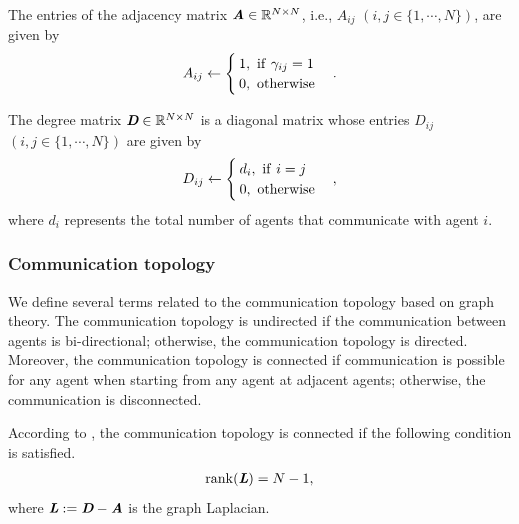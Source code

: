 \documentclass[letterpaper, 10 pt, conference]{ieeeconf} %
\begin{document}
The entries of the adjacency matrix $\textit{\textbf{A}}\in \mathbb{R}^{N\times N}$, i.e., $A_{ij}$ $(i,j\in\{1,\cdots,N\})$, are given by
\begin{eqnarray}
A_{ij}\leftarrow
\begin{cases}
1,\ {\rm if}\ \gamma_{ij}=1 \\
0,\ {\rm otherwise}
\end{cases}.
\nonumber
\end{eqnarray}

The degree matrix $\textit{\textbf{D}}\in \mathbb{R}^{N\times N}$ is a diagonal matrix whose entries $D_{ij}$ $(i,j\in\{1,\cdots,N\})$ are given by
\begin{eqnarray}
D_{ij}\leftarrow
\begin{cases}
d_i,\ {\rm if}\ i=j \\
0,\ {\rm otherwise}
\end{cases},
\nonumber
\end{eqnarray}
where $d_i$ represents the total number of agents that communicate with agent $i$.

\subsubsection{Communication topology}
We define several terms related to the communication topology based on graph theory. The communication topology is undirected if the communication between agents is bi-directional; otherwise, the communication topology is directed. Moreover, the communication topology is connected if communication is possible for any agent when starting from any agent at adjacent agents; otherwise, the communication is disconnected.

According to \cite{Saber2007}, the communication topology is connected if the following condition is satisfied.
\begin{eqnarray}
{\rm rank}(\textit{\textbf{L}})=N-1,
\label{rank}
\end{eqnarray}
where $\textit{\textbf{L}}:=\textit{\textbf{D}}-\textit{\textbf{A}}$ is
the graph Laplacian. 
\end{document}

